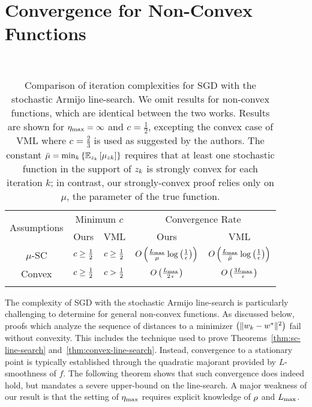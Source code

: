 \section{Convergence for Non-Convex Functions}~\label{sec:ls-nc}

\begin{table}[t]
    \centering
    \begin{tabular}{c l l c c }\toprule
        \multirow{2}{*}{Assumptions} & \multicolumn{2}{c}{Minimum \( c \)} & \multicolumn{2}{c}{Convergence Rate}\\%
        \cmidrule(lr){2-3} \cmidrule(lr){4-5}
                 & \multicolumn{1}{c}{Ours} & \multicolumn{1}{c}{VML}%
                 & \multicolumn{1}{c}{Ours} & \multicolumn{1}{c}{VML}\\ \midrule
    \( \mu \)-SC & \( c \geq \frac 1 2 \)%
                 & \( c \geq \frac 1 2 \)%
                 & \( O\left(\frac{L_{\text{max}}}{\mu} \log\left(\frac{1}{\epsilon}\right)\right) \)%
                 & \( O\left(\frac{L_{\text{max}}}{\bar \mu} \log\left(\frac{1}{\epsilon}\right)\right) \) \\ \addlinespace
    Convex       & \( c \geq \frac 1 2 \)%
                 & \( c > \frac 1 2 \)%
                 & \( O\left(\frac{L_{\text{max}}}{2 \, \epsilon}\right) \)%
                 & \( O\left(\frac{3 L_{\text{max}}}{\epsilon}\right) \)\\ \addlinespace 
        \end{tabular}
        \caption{Comparison of iteration complexities for \ac{SGD} with the stochastic Armijo line-search.  We omit results for non-convex functions, which are identical between the two works. Results are shown for \( \eta_{\text{max}} = \infty \) and \( c = \frac{1}{2} \), excepting the convex case of VML \citep{vaswani2019painless} where \( c = \frac{2}{3} \) is used as suggested by the authors. The constant \( \bar \mu = \min_k \left\{\mathbb{E}_{z_{k}} \left[\mu_{zk}\right] \right\} \) requires that at least one stochastic function in the support of \( z_{k} \) is strongly convex for each iteration \( k \); in contrast, our strongly-convex proof relies only on \( \mu \), the parameter of the true function.  }%
    \label{table:ls-comparison}
\end{table}

The complexity of \ac{SGD} with the stochastic Armijo line-search is particularly challenging to determine for general non-convex functions.
As discussed below, proofs which analyze the sequence of distances to a minimizer \( \left(\|w_k - w^*\|^2\right) \) fail without convexity.
This includes the technique used to prove Theorems~\ref{thm:sc-line-search} and~\ref{thm:convex-line-search}.
Instead, convergence to a stationary point is typically established through the quadratic majorant provided by \( L \)-smoothness of \( f \).
The following theorem shows that such convergence does indeed hold, but mandates a severe upper-bound on the line-search.
A major weakness of our result is that the setting of \( \eta_{\text{max}} \) requires explicit knowledge of \( \rho \) and \( L_{\text{max}} \). 

